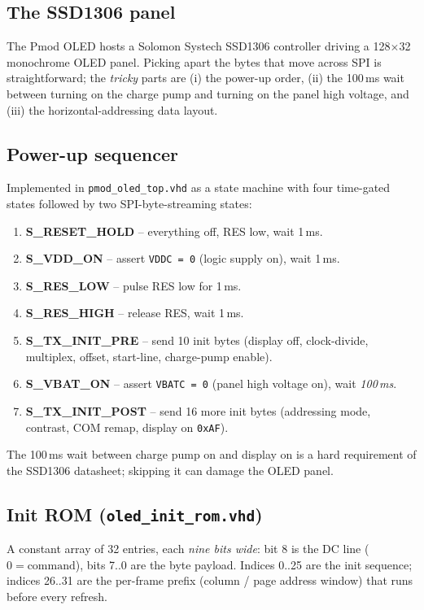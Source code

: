 \documentclass[11pt,a4paper]{article}
\begin{document}
\subsection{The SSD1306 panel}

The Pmod OLED hosts a Solomon Systech SSD1306 controller driving a
128$\times$32 monochrome OLED panel.  Picking apart the bytes that move
across SPI is straightforward; the \emph{tricky} parts are
(i) the power-up order, (ii) the 100\,ms wait between turning on the
charge pump and turning on the panel high voltage, and (iii) the
horizontal-addressing data layout.

\subsection{Power-up sequencer}

Implemented in \texttt{pmod\_oled\_top.vhd} as a state machine with
four time-gated states followed by two SPI-byte-streaming states:

\begin{enumerate}
  \item \textbf{S\_RESET\_HOLD} -- everything off, RES low, wait 1\,ms.
  \item \textbf{S\_VDD\_ON} -- assert \texttt{VDDC = 0} (logic supply on),
        wait 1\,ms.
  \item \textbf{S\_RES\_LOW} -- pulse RES low for 1\,ms.
  \item \textbf{S\_RES\_HIGH} -- release RES, wait 1\,ms.
  \item \textbf{S\_TX\_INIT\_PRE} -- send 10 init bytes (display off,
        clock-divide, multiplex, offset, start-line, charge-pump enable).
  \item \textbf{S\_VBAT\_ON} -- assert \texttt{VBATC = 0} (panel
        high voltage on), wait \emph{100\,ms}.
  \item \textbf{S\_TX\_INIT\_POST} -- send 16 more init bytes
        (addressing mode, contrast, COM remap, display on \texttt{0xAF}).
\end{enumerate}

The 100\,ms wait between charge pump on and display on is a
hard requirement of the SSD1306 datasheet; skipping it can damage the
OLED panel.

\subsection{Init ROM (\texttt{oled\_init\_rom.vhd})}

A constant array of 32 entries, each \emph{nine bits wide}: bit 8 is the
DC line (\(0 = \text{command}\)), bits 7..0 are the byte payload.
Indices 0..25 are the init sequence; indices 26..31 are the per-frame
prefix (column / page address window) that runs before every refresh.
\end{document}
